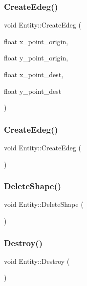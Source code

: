 \subsubsection{\texorpdfstring{Create\+Edeg()}{CreateEdeg()}\hspace{0.1cm}{\footnotesize\ttfamily [1/2]}}
{\footnotesize\ttfamily void Entity\+::\+Create\+Edeg (\begin{DoxyParamCaption}\item[{float}]{x\+\_\+point\+\_\+origin,  }\item[{float}]{y\+\_\+point\+\_\+origin,  }\item[{float}]{x\+\_\+point\+\_\+dest,  }\item[{float}]{y\+\_\+point\+\_\+dest }\end{DoxyParamCaption})}

\mbox{\label{classEntity_af26655d5ca92e2a075940fc17fe68b1f}} 
\subsubsection{\texorpdfstring{Create\+Edeg()}{CreateEdeg()}\hspace{0.1cm}{\footnotesize\ttfamily [2/2]}}
{\footnotesize\ttfamily void Entity\+::\+Create\+Edeg (\begin{DoxyParamCaption}{ }\end{DoxyParamCaption})}

\mbox{\label{classEntity_a5910a6f56586f89d31b34f175ad29ea1}} 
\subsubsection{\texorpdfstring{Delete\+Shape()}{DeleteShape()}}
{\footnotesize\ttfamily void Entity\+::\+Delete\+Shape (\begin{DoxyParamCaption}{ }\end{DoxyParamCaption})\hspace{0.3cm}{\ttfamily [inline]}}

\mbox{\label{classEntity_aa75151fc607686b42d27f8c3ba73143d}} 
\subsubsection{\texorpdfstring{Destroy()}{Destroy()}}
{\footnotesize\ttfamily void Entity\+::\+Destroy (\begin{DoxyParamCaption}{ }\end{DoxyParamCaption})}

